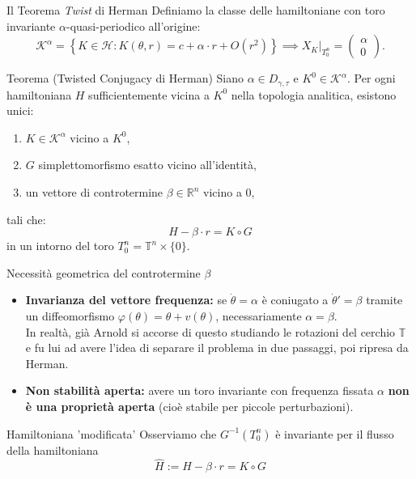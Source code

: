 \documentclass[10pt,aspectratio=169]{beamer}
\newcommand{\T}{\mathbb{T}}
\newcommand{\R}{\mathbb{R}}
\newcommand{\blu}[1]{\textcolor{UniBlue}{\textbf{#1}}}
\begin{document}
\begin{frame}{Il Teorema \textit{Twist} di Herman}
  Definiamo la classe delle hamiltoniane con toro invariante $\alpha$-quasi-periodico all'origine:
  \[
    \mathcal{K}^\alpha = \left\{ K \in \mathcal{H} : K(\theta, r) = c + \alpha \cdot r + O(r^2) \right\} \implies X_K|_{T^n_0} = \begin{pmatrix} \alpha \\ 0 \end{pmatrix}.
  \]
  \begin{block}{Teorema (Twisted Conjugacy di Herman)}
    Siano $\alpha \in D_{\gamma, \tau}$ e $K^0 \in \mathcal{K}^\alpha$. Per ogni hamiltoniana $H$ sufficientemente vicina a $K^0$ nella topologia analitica, esistono unici:
    \begin{enumerate}
      \item $K \in \mathcal{K}^\alpha$ vicino a $K^0$,
      \item $G$ simplettomorfismo esatto vicino all'identità,
      \item un vettore di controtermine $\beta \in \R^n$ vicino a $0$,
    \end{enumerate}
    tali che:
    \[
      H - \beta \cdot r = K \circ G
    \]
    in un intorno del toro $T_0^n = \T^n \times \{0\}$.
  \end{block}
\end{frame}

\begin{frame}{Necessità geometrica del controtermine $\beta$}
  \begin{itemize}
    \item \blu{Invarianza del vettore frequenza:} se $\dot{\theta} = \alpha$ è coniugato a $\dot{\theta}' = \beta$ tramite un diffeomorfismo $\varphi(\theta) = \theta + v(\theta)$, necessariamente $\alpha = \beta$. \\
    In realtà, già Arnold si accorse di questo studiando le rotazioni del cerchio $\T$ e fu lui ad avere l'idea di separare il problema in due passaggi, poi ripresa da Herman.
  \end{itemize}
  \bigbreak  
  \begin{itemize}
    \item \blu{Non stabilità aperta:} avere un toro invariante con frequenza fissata $\alpha$ \textbf{non è una proprietà aperta} (cioè stabile per piccole perturbazioni).
  \end{itemize}
  \pause
  \begin{block}{Hamiltoniana 'modificata'}
    Osserviamo che $G^{-1}(T^n_0)$ è invariante per il flusso della hamiltoniana
    \[
      \widehat{H} := H - \beta \cdot r = K \circ G
    \]
  \end{block}
\end{frame}
\end{document}
